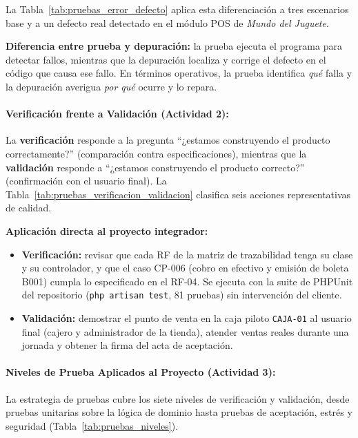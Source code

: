 \documentclass[12pt,a4paper]{article}
\begin{document}
La Tabla~\ref{tab:pruebas_error_defecto} aplica esta diferenciación a tres escenarios base y a un defecto real detectado en el módulo POS de \textit{Mundo del Juguete}.



\textbf{Diferencia entre prueba y depuración:} la prueba ejecuta el programa para detectar fallos, mientras que la depuración localiza y corrige el defecto en el código que causa ese fallo. En términos operativos, la prueba identifica \textit{qué} falla y la depuración averigua \textit{por qué} ocurre y lo repara.

\paragraph{Verificación frente a Validación (Actividad 2):}
La \textbf{verificación} responde a la pregunta ``¿estamos construyendo el producto correctamente?'' (comparación contra especificaciones), mientras que la \textbf{validación} responde a ``¿estamos construyendo el producto correcto?'' (confirmación con el usuario final). La Tabla~\ref{tab:pruebas_verificacion_validacion} clasifica seis acciones representativas de calidad.



\textbf{Aplicación directa al proyecto integrador:}
\begin{itemize}
  \item \textbf{Verificación:} revisar que cada RF de la matriz de trazabilidad tenga su clase y su controlador, y que el caso CP-006 (cobro en efectivo y emisión de boleta B001) cumpla lo especificado en el RF-04. Se ejecuta con la suite de PHPUnit del repositorio (\texttt{php artisan test}, 81 pruebas) sin intervención del cliente.
  \item \textbf{Validación:} demostrar el punto de venta en la caja piloto \texttt{CAJA-01} al usuario final (cajero y administrador de la tienda), atender ventas reales durante una jornada y obtener la firma del acta de aceptación.
\end{itemize}

\paragraph{Niveles de Prueba Aplicados al Proyecto (Actividad 3):}
La estrategia de pruebas cubre los siete niveles de verificación y validación, desde pruebas unitarias sobre la lógica de dominio hasta pruebas de aceptación, estrés y seguridad (Tabla~\ref{tab:pruebas_niveles}).
\end{document}
